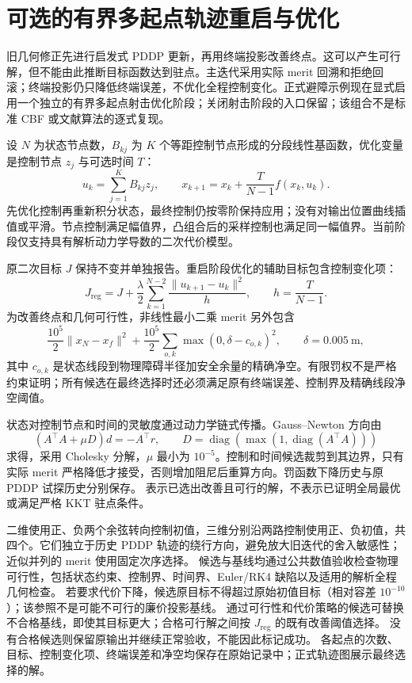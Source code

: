 \section{可选的有界多起点轨迹重启与优化}
\label{sec:geometry-refinement}

旧几何修正先进行启发式 PDDP 更新，再用终端投影改善终点。这可以产生可行解，但不能由此推断目标函数达到驻点。主迭代采用实际 merit 回溯和拒绝回滚；终端投影仍只降低终端误差，不优化全程控制变化。正式避障示例现在显式启用一个独立的有界多起点射击优化阶段；关闭射击阶段的入口保留；该组合不是标准 CBF 或文献算法的逐式复现。

设 $N$ 为状态节点数，$B_{kj}$ 为 $K$ 个等距控制节点形成的分段线性基函数，优化变量是控制节点 $z_j$ 与可选时间 $T$：
\[
 u_k=\sum_{j=1}^{K}B_{kj}z_j,\qquad
 x_{k+1}=x_k+\frac{T}{N-1}f(x_k,u_k).
\]
先优化控制再重新积分状态，最终控制仍按零阶保持应用；没有对输出位置曲线插值或平滑。节点控制满足幅值界，凸组合后的采样控制也满足同一幅值界。当前阶段仅支持具有解析动力学导数的二次代价模型。

原二次目标 $J$ 保持不变并单独报告。重启阶段优化的辅助目标包含控制变化项：
\[
 J_{\mathrm{reg}}=J+\frac{\lambda}{2}
  \sum_{k=1}^{N-2}\frac{\|u_{k+1}-u_k\|^2}{h},\qquad h=\frac{T}{N-1}.
\]
为改善终点和几何可行性，非线性最小二乘 merit 另外包含
\[
 \frac{10^5}{2}\|x_N-x_f\|^2+
 \frac{10^5}{2}\sum_{o,k}\max(0,\delta-c_{o,k})^2,
 \qquad \delta=0.005\ \mathrm{m},
\]
其中 $c_{o,k}$ 是状态线段到物理障碍半径加安全余量的精确净空。有限罚权不是严格约束证明；所有候选在最终选择时还必须满足原有终端误差、控制界及精确线段净空阈值。

状态对控制节点和时间的灵敏度通过动力学链式传播。Gauss--Newton 方向由
\[
 (A^\top A+\mu D)d=-A^\top r,\qquad
 D=\operatorname{diag}(\max(1,\operatorname{diag}(A^\top A)))
\]
求得，采用 Cholesky 分解，$\mu$ 最小为 $10^{-5}$。控制和时间候选裁剪到其边界，只有实际 merit 严格降低才接受，否则增加阻尼后重算方向。罚函数下降历史与原 PDDP 试探历史分别保存。 表示已选出改善且可行的解，不表示已证明全局最优或满足严格 KKT 驻点条件。

二维使用正、负两个余弦转向控制初值，三维分别沿两路控制使用正、负初值，共四个。它们独立于历史 PDDP 轨迹的绕行方向，避免放大旧迭代的舍入敏感性；近似并列的 merit 使用固定次序选择。
候选与基线均通过公共数值验收检查物理可行性，包括状态约束、控制界、时间界、Euler/RK4 缺陷以及适用的解析全程几何检查。
若要求代价下降，候选原目标不得超过原始初值目标（相对容差 $10^{-10}$）；该参照不是可能不可行的廉价投影基线。
通过可行性和代价策略的候选可替换不合格基线，即使其目标更大；合格可行解之间按 $J_{\mathrm{reg}}$ 的既有改善阈值选择。
没有合格候选则保留原输出并继续正常验收，不能因此标记成功。
各起点的次数、目标、控制变化项、终端误差和净空均保存在原始记录中；正式轨迹图展示最终选择的解。

